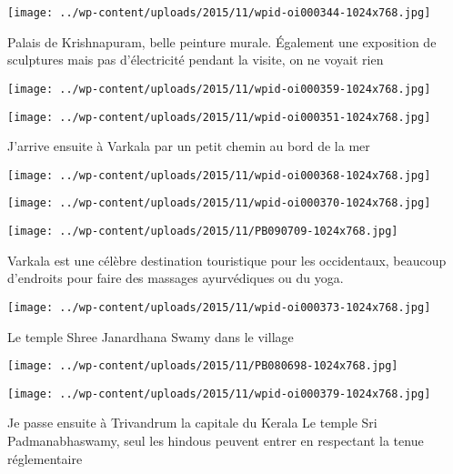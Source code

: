  \newline
\centerline{\texttt{[image: ../wp-content/uploads/2015/11/wpid-oi000344-1024x768.jpg]} } 
 \newline
 Palais de Krishnapuram, belle peinture murale. Également une exposition de sculptures mais pas d'électricité pendant la visite, on ne voyait rien \newline
 \newline
\centerline{\texttt{[image: ../wp-content/uploads/2015/11/wpid-oi000359-1024x768.jpg]} } 
 \newline
 \newline
\centerline{\texttt{[image: ../wp-content/uploads/2015/11/wpid-oi000351-1024x768.jpg]} } 
 \newline
 J'arrive ensuite à Varkala par un petit chemin au bord de la mer \newline
 \newline
\centerline{\texttt{[image: ../wp-content/uploads/2015/11/wpid-oi000368-1024x768.jpg]} } 
 \newline
 \newline
\centerline{\texttt{[image: ../wp-content/uploads/2015/11/wpid-oi000370-1024x768.jpg]} } 
 \newline
 \newline
\centerline{\texttt{[image: ../wp-content/uploads/2015/11/PB090709-1024x768.jpg]} } 
 \newline
 Varkala est une célèbre destination touristique pour les occidentaux, beaucoup d'endroits pour faire des massages ayurvédiques ou du yoga. \newline
 \newline
\centerline{\texttt{[image: ../wp-content/uploads/2015/11/wpid-oi000373-1024x768.jpg]} } 
 \newline
 Le temple Shree Janardhana Swamy dans le village \newline
 \newline
\centerline{\texttt{[image: ../wp-content/uploads/2015/11/PB080698-1024x768.jpg]} } 
 \newline
 \newline
\centerline{\texttt{[image: ../wp-content/uploads/2015/11/wpid-oi000379-1024x768.jpg]} } 
 \newline
 Je passe ensuite à Trivandrum la capitale du Kerala \newline
 Le temple Sri Padmanabhaswamy, seul les hindous peuvent entrer en respectant la tenue réglementaire \newline
